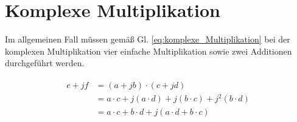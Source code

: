 \section{Komplexe Multiplikation}\label{sec:komplexe_Multiplikation}

Im allgemeinen Fall müssen gemäß Gl. \ref{eq:komplexe_Multiplikation} bei der komplexen Multiplikation vier einfache Multiplikation sowie zwei Additionen durchgeführt werden.

\begin{align}\label{eq:komplexe_Multiplikation}
\begin{split}
 e + jf &= (a + jb) \cdot (c + jd)\\
        &= a \cdot c + j(a \cdot d) + j(b \cdot c) + j^2(b \cdot d)\\
        &= a \cdot c + b \cdot d + j(a \cdot d + b \cdot c)
\end{split}
\end{align}


